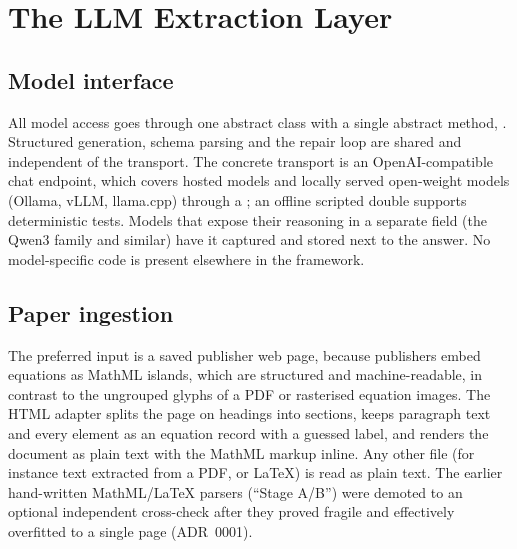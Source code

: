 \section{The LLM Extraction Layer}
\label{sec:llm}

\subsection{Model interface}
All model access goes through one abstract class with a single abstract method, . Structured generation, schema parsing and the repair loop are shared and independent of the transport. The concrete transport is an OpenAI-compatible chat endpoint, which covers hosted models and locally served open-weight models (Ollama, vLLM, llama.cpp) through a ; an offline scripted double supports deterministic tests. Models that expose their reasoning in a separate field (the Qwen3 family and similar) have it captured and stored next to the answer. No model-specific code is present elsewhere in the framework.

\subsection{Paper ingestion}
The preferred input is a saved publisher web page, because publishers embed equations as MathML islands, which are structured and machine-readable, in contrast to the ungrouped glyphs of a PDF or rasterised equation images. The HTML adapter splits the page on headings into sections, keeps paragraph text and every  element as an equation record with a guessed label, and renders the document as plain text with the MathML markup inline. Any other file (for instance text extracted from a PDF, or LaTeX) is read as plain text. The earlier hand-written MathML/LaTeX parsers (``Stage A/B'') were demoted to an optional independent cross-check after they proved fragile and effectively overfitted to a single page (ADR~0001).

